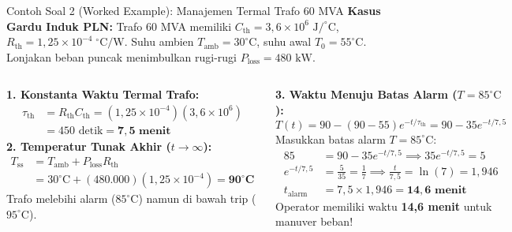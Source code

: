 \documentclass[aspectratio=169,10pt]{beamer}
\begin{document}
\begin{frame}{Contoh Soal 2 (Worked Example): Manajemen Termal Trafo 60 MVA}
  \textbf{Kasus Gardu Induk PLN:} Trafo 60 MVA memiliki $C_{\text{th}} = 3{,}6 \times 10^6\text{ J}/^\circ\text{C}$, $R_{\text{th}} = 1{,}25 \times 10^{-4}\;^\circ\text{C}/\text{W}$. Suhu ambien $T_{\text{amb}} = 30^\circ\text{C}$, suhu awal $T_0 = 55^\circ\text{C}$. Lonjakan beban puncak menimbulkan rugi-rugi $P_{\text{loss}} = 480\text{ kW}$.
  \vspace{0.15cm}

  \begin{columns}[t]
    \textbf{1. Konstanta Waktu Termal Trafo:}
    \begin{align*}
      \tau_{\text{th}} &= R_{\text{th}} C_{\text{th}} = (1{,}25 \times 10^{-4})(3{,}6 \times 10^6) \\
                       &= 450\text{ detik} = \mathbf{7{,}5\text{ menit}}
    \end{align*}
    \textbf{2. Temperatur Tunak Akhir ($t \to \infty$):}
    \begin{align*}
      T_{\text{ss}} &= T_{\text{amb}} + P_{\text{loss}} R_{\text{th}} \\
                    &= 30^\circ\text{C} + (480.000)(1{,}25 \times 10^{-4}) = \mathbf{90^\circ\text{C}}
    \end{align*}
    Trafo melebihi alarm ($85^\circ\text{C}$) namun di bawah trip ($95^\circ\text{C}$).

    \textbf{3. Waktu Menuju Batas Alarm ($T = 85^\circ\text{C}$):}
    \begin{equation*}
      T(t) = 90 - (90 - 55) e^{-t/\tau_{\text{th}}} = 90 - 35 e^{-t/7{,}5}
    \end{equation*}
    Masukkan batas alarm $T = 85^\circ\text{C}$:
    \begin{align*}
      85 &= 90 - 35 e^{-t/7{,}5} \implies 35 e^{-t/7{,}5} = 5 \\
      e^{-t/7{,}5} &= \frac{5}{35} = \frac{1}{7} \implies \frac{t}{7{,}5} = \ln(7) = 1{,}946 \\
      t_{\text{alarm}} &= 7{,}5 \times 1{,}946 = \mathbf{14{,}6\text{ menit}}
    \end{align*}
    Operator memiliki waktu \textbf{14,6 menit} untuk manuver beban!
  \end{columns}
\end{frame}
\end{document}
